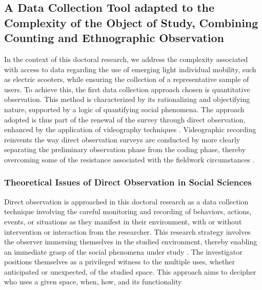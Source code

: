 \begin{refsegment}
\subsection{A Data Collection Tool adapted to the Complexity of the Object of Study, Combining Counting and Ethnographic Observation
    \label{chap3:observation-quantitative-outil-adapte}
    }

In the context of this doctoral research, we address the complexity associated with access to data regarding the use of emerging light individual mobility, such as electric scooters, while ensuring the collection of a representative sample of users. To achieve this, the first data collection approach chosen is quantitative observation. This method is characterized by its rationalizing and objectifying nature, supported by a logic of quantifying social phenomena. The approach adopted is thus part of the renewal of the survey through direct observation, enhanced by the application of videography techniques \textcolor{blue}{\autocite[43]{filion_compter_2011}}. Videographic recording reinvents the way direct observation surveys are conducted by more clearly separating the preliminary observation phase from the coding phase, thereby overcoming some of the resistance associated with the fieldwork circumstances \textcolor{blue}{\autocite[100]{cochoy_mort_2013}}.%

\subsubsection*{Theoretical Issues of Direct Observation in Social Sciences
    \label{chap3:enjeux-observation}
    }

Direct observation is approached in this doctoral research as a data collection technique involving the careful monitoring and recording of behaviors, actions, events, or situations as they manifest in their environment, with or without intervention or interaction from the researcher. This research strategy involves the observer immersing themselves in the studied environment, thereby enabling an immediate grasp of the social phenomena under study \textcolor{blue}{\autocite[15]{revillard_observation_2018}}. The investigator positions themselves as a privileged witness to the multiple uses, whether anticipated or unexpected, of the studied space. This approach aims to decipher who uses a given space, when, how, and its functionality \textcolor{blue}{\autocite[15]{revillard_observation_2018}} %


\end{refsegment}

